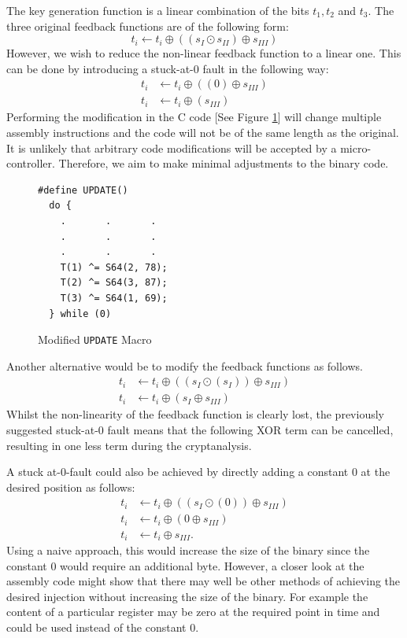 \documentclass[conference]{IEEEtran}
\newcommand{\code}[1]{\texttt{#1}}
\begin{document}
The key generation function is a linear combination of the bits $t_1, t_2$ and $t_3$.
The three original feedback functions are of the following form: $$t_i \gets t_i \oplus ((s_I \odot s_{II}) \oplus s_{III})$$ However, we wish to reduce the non-linear feedback function to a linear one. This can be done by introducing a stuck-at-0 fault in the following way:
\begin{align}\label{fault}
t_i &\gets t_i \oplus ((0) \oplus s_{III})\\
t_i &\gets t_i \oplus (s_{III})
\end{align}
Performing the modification in the C code [See Figure \ref{modified-macro}] will change multiple assembly instructions and the code will not be of the same length as the original. It is unlikely that arbitrary code modifications will be accepted by a micro-controller. Therefore, we aim to make minimal adjustments to the binary code.
\begin{figure}[H]
\begin{lstlisting}[style=snippet, frame=tlrb]
#define UPDATE()
  do {
    .       .       .
    .       .       .
    .       .       .
    T(1) ^= S64(2, 78); 
    T(2) ^= S64(3, 87); 
    T(3) ^= S64(1, 69); 
  } while (0)
\end{lstlisting}
\caption{Modified \code{UPDATE} Macro}
\label{modified-macro}
\end{figure}

Another alternative would be to modify the feedback functions as follows.
\begin{align}
t_i &\gets t_i \oplus ((s_I \odot (s_I)) \oplus s_{III})\label{form:and}\\
t_i &\gets t_i \oplus (s_I \oplus s_{III})
\end{align}
Whilst the non-linearity of the feedback function is clearly lost, the previously suggested stuck-at-0 fault means that the following XOR term can be cancelled, resulting in one less term during the cryptanalysis.

A stuck at-0-fault could also be achieved by directly adding a constant 0 at the desired position as follows:
\begin{align*}
t_i &\gets t_i \oplus ((s_I \odot (0)) \oplus s_{III})\\
t_i &\gets t_i \oplus (0 \oplus s_{III})\\
t_i &\gets t_i \oplus s_{III}.
\end{align*}
Using a naive approach, this would increase the size of the binary since the constant 0 would require an additional byte. However, a closer look at the assembly code might show that there may well be other methods of achieving the desired injection without increasing the size of the binary. For example the content of a particular register may be zero at the required point in time and could be used instead of the constant 0.
\end{document}
